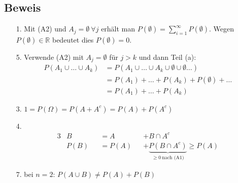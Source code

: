 \subsection{Beweis}
\begin{enumerate}
    \item[1.] Mit (A2) und $A_j=\emptyset \ \forall j$ erhält man $P(\emptyset) = \sum_{i=1}^\infty P(\emptyset)$.
    Wegen $P(\emptyset) \in \mathbb{R}$ bedeutet dies $P(\emptyset) = 0$.
    \item[5.] Verwende (A2) mit $A_j=\emptyset$ für $j>k$ und dann Teil (a):
    \begin{align*}
        P(A_1 \cup \ldots \cup A_k) & =
        P(A_1 \cup \ldots \cup A_k \cup \emptyset \cup \emptyset \ldots) \\ & =
        P(A_1) + \ldots + P(A_k) + P(\emptyset) + \ldots \\ & =
        P(A_1) + \ldots + P(A_k)
    \end{align*}
    \item[3.] $1 = P(\Omega) = P(A + A^c) = P(A) + P(A^c)$
    \item[4.]
    \begin{alignat*}{3}
        &B    && = A    && + B \cap A^c\\
        &P(B) && = P(A) && + \underbrace{P(B\cap A^c)}_{\geq 0 \ \text{nach (A1)}} \geq P(A)
    \end{alignat*}
    \item[7.] bei $n=2$: $P(A \cup B) \neq P(A) + P(B)$
\end{enumerate}
